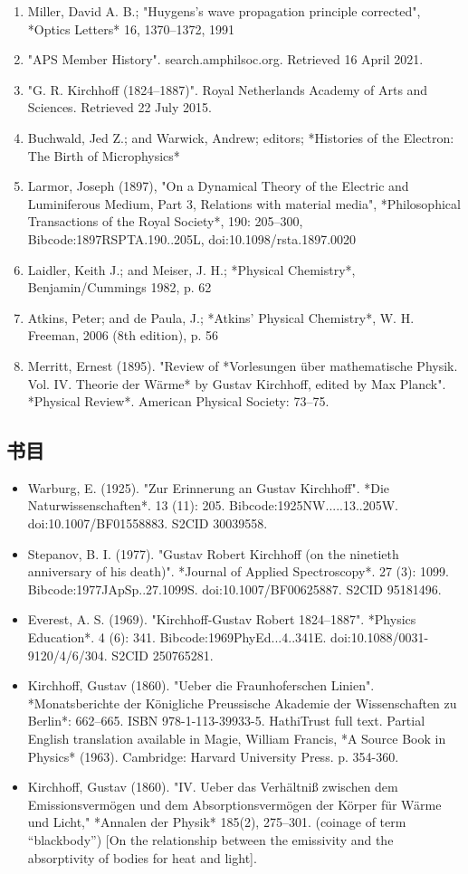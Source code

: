 \begin{enumerate}
\item Miller, David A. B.; "Huygens's wave propagation principle corrected", *Optics Letters* 16, 1370–1372, 1991  
\item "APS Member History". search.amphilsoc.org. Retrieved 16 April 2021.  
\item "G. R. Kirchhoff (1824–1887)". Royal Netherlands Academy of Arts and Sciences. Retrieved 22 July 2015.  
\item Buchwald, Jed Z.; and Warwick, Andrew; editors; *Histories of the Electron: The Birth of Microphysics*  
\item Larmor, Joseph (1897), "On a Dynamical Theory of the Electric and Luminiferous Medium, Part 3, Relations with material media", *Philosophical Transactions of the Royal Society*, 190: 205–300, Bibcode:1897RSPTA.190..205L, doi:10.1098/rsta.1897.0020  
\item Laidler, Keith J.; and Meiser, J. H.; *Physical Chemistry*, Benjamin/Cummings 1982, p. 62  
\item Atkins, Peter; and de Paula, J.; *Atkins' Physical Chemistry*, W. H. Freeman, 2006 (8th edition), p. 56  
\item Merritt, Ernest (1895). "Review of *Vorlesungen über mathematische Physik. Vol. IV. Theorie der Wärme* by Gustav Kirchhoff, edited by Max Planck". *Physical Review*. American Physical Society: 73–75.
\end{enumerate}
\subsection{书目}
\begin{itemize}
\item Warburg, E. (1925). "Zur Erinnerung an Gustav Kirchhoff". *Die Naturwissenschaften*. 13 (11): 205. Bibcode:1925NW.....13..205W. doi:10.1007/BF01558883. S2CID 30039558.  
\item Stepanov, B. I. (1977). "Gustav Robert Kirchhoff (on the ninetieth anniversary of his death)". *Journal of Applied Spectroscopy*. 27 (3): 1099. Bibcode:1977JApSp..27.1099S. doi:10.1007/BF00625887. S2CID 95181496.  
\item Everest, A. S. (1969). "Kirchhoff-Gustav Robert 1824–1887". *Physics Education*. 4 (6): 341. Bibcode:1969PhyEd...4..341E. doi:10.1088/0031-9120/4/6/304. S2CID 250765281.  
\item Kirchhoff, Gustav (1860). "Ueber die Fraunhoferschen Linien". *Monatsberichte der Königliche Preussische Akademie der Wissenschaften zu Berlin*: 662–665. ISBN 978-1-113-39933-5. HathiTrust full text. Partial English translation available in Magie, William Francis, *A Source Book in Physics* (1963). Cambridge: Harvard University Press. p. 354-360.  
\item Kirchhoff, Gustav (1860). "IV. Ueber das Verhältniß zwischen dem Emissionsvermögen und dem Absorptionsvermögen der Körper für Wärme und Licht," *Annalen der Physik* 185(2), 275–301. (coinage of term “blackbody”) [On the relationship between the emissivity and the absorptivity of bodies for heat and light].
\end{itemize}
